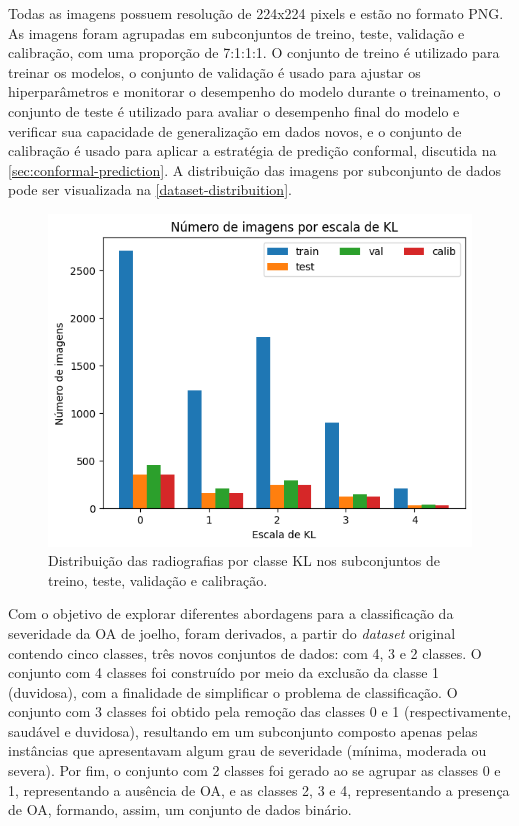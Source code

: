 Todas as imagens possuem resolução de 224x224 pixels e estão no formato PNG. As imagens foram agrupadas em subconjuntos de treino, teste, validação e calibração, com uma proporção de 7:1:1:1. O conjunto de treino é utilizado para treinar os modelos, o conjunto de validação é usado para ajustar os hiperparâmetros e monitorar o desempenho do modelo durante o treinamento, o conjunto de teste é utilizado para avaliar o desempenho final do modelo e verificar sua capacidade de generalização em dados novos, e o conjunto de calibração é usado para aplicar a estratégia de predição conformal, discutida na \autoref{sec:conformal-prediction}. A distribuição das imagens por subconjunto de dados pode ser visualizada na \autoref{dataset-distribuition}.

\begin{figure}[ht]
    \centering
    \includegraphics[width=0.7\linewidth]{figs/dataset-class-distribution.png}
    \caption{Distribuição das radiografias por classe KL nos subconjuntos de treino, teste, validação e calibração.}
    \label{dataset-distribuition}
\end{figure}

Com o objetivo de explorar diferentes abordagens para a classificação da severidade da OA de joelho, foram derivados, a partir do \textit{dataset} original contendo cinco classes, três novos conjuntos de dados: com 4, 3 e 2 classes. O conjunto com 4 classes foi construído por meio da exclusão da classe 1 (duvidosa), com a finalidade de simplificar o problema de classificação. O conjunto com 3 classes foi obtido pela remoção das classes 0 e 1 (respectivamente, saudável e duvidosa), resultando em um subconjunto composto apenas pelas instâncias que apresentavam algum grau de severidade (mínima, moderada ou severa). Por fim, o conjunto com 2 classes foi gerado ao se agrupar as classes 0 e 1, representando a ausência de OA, e as classes 2, 3 e 4, representando a presença de OA, formando, assim, um conjunto de dados binário.

